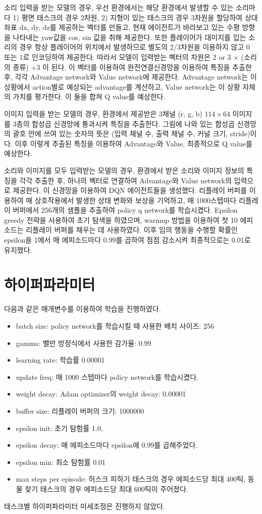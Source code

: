 \documentclass[oneside, under, ko]{snuthesis}
\begin{document}
소리 입력을 받는 모델의 경우, 우선 환경에서는 해당 환경에서 발생할 수 있는 소리마다 1) 평면 태스크의 경우 2차원, 2) 지형이 있는 태스크의 경우 3차원을 할당하여 상대 좌표 dx, dy, dz를 제공하는 벡터를 만들고, 현재 에이전트가 바라보고 있는 수평 방향을 나타내는 yaw값을 cos, sin 값을 취해 제공한다.\cite{Rotation} 또한 플레이어가 대미지를 입는 소리의 경우 항상 플레이어의 위치에서 발생하므로 별도의 2/3차원을 이용하지 않고 0 또는 1로 인코딩하여 제공한다. 따라서 모델이 입력받는 벡터의 차원은 $2$ or $3$ $\times$ (소리의 종류) $ + 3$ 이 된다. 이 벡터를 이용하여 완전연결신경망을 이용하여 특징을 추출한 후, 각각 Advantage network와 Value network에 제공한다. Advantage network는 이 상황에서 action별로 예상되는 advantage를 계산하고, Value network는 이 상황 자체의 가치를 평가한다. 이 둘을 합쳐 Q value를 예상한다.

이미지 입력을 받는 모델의 경우, 환경에서 제공받은 3채널 (r, g, b) $114 \times 64$ 이미지를 3층의 합성곱 신경망에 통과시켜 특징을 추출한다. 그림에 나와 있는 합성곱 신경망의 괄호 안에 쓰여 있는 숫자의 뜻은 (입력 채널 수, 출력 채널 수, 커널 크기, stride)이다. 이후 이렇게 추출된 특징을 이용하여 Advantage와 Value, 최종적으로 Q value를 예상한다.

소리와 이미지를 모두 입력받는 모델의 경우, 환경에서 받은 소리와 이미지 정보의 특징을 각각 추출한 후, 하나의 벡터로 연결하여 Advantage와 Value network의 입력으로 제공한다. 이 신경망을 이용하여 DQN 에이전트들을 생성했다. 리플레이 버퍼를 이용하여 매 상호작용에서 발생한 상태 변화와 보상을 기억하고, 매 1000스텝마다 리플레이 버퍼에서 256개의 샘플을 추출하여 policy q network를 학습시켰다. Epsilon greedy 전략을 사용하여 초기 탐색을 하였으며, warmup 방법을 이용하여 첫 10 에피소드는 리플레이 버퍼를 채우는 데 사용하였다. 이후 임의 행동을 수행할 확률인 epsilon을 1에서 매 에피소드마다 0.99를 곱하여 점점 감소시켜 최종적으로는 0.01로 유지했다.

\section{하이퍼파라미터}
다음과 같은 매개변수를 이용하여 학습을 진행하였다.
\begin{itemize}
    \item batch size: policy network를 학습시킬 때 사용한 배치 사이즈: 256
    \item gamma: 벨만 방정식에서 사용한 감가율: 0.99
    \item learning rate: 학습률 0.00001
    \item update freq: 매 1000 스텝마다 policy network를 학습시켰다.
    \item weight decay: Adam optimizer의 weight decay: 0.00001
    \item buffer size: 리플레이 버퍼의 크기: 1000000
    \item epsilon init: 초기 탐험률 1.0,
    \item epsilon decay: 매 에피소드마다 epsilon에 0.99를 곱해주었다.
    \item epsilon min: 최소 탐험률 0.01
    \item max steps per episode: 허스크 피하기 태스크의 경우 에피소드당 최대 400틱, 동물 찾기 태스크의 경우 에피소드당 최대 600틱이 주어졌다.
\end{itemize}
태스크별 하이퍼파라미터 미세조정은 진행하지 않았다.
\end{document}

